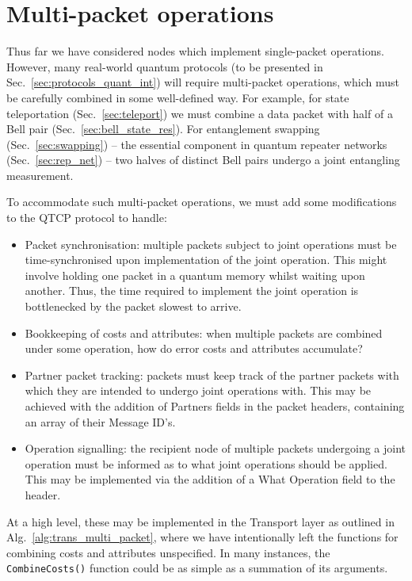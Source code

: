\documentclass[aps, rmp, twocolumn, amsmath, amssymb, nofootinbib, superscriptaddress, longbibliography, floatfix, table-of-contents, eqsecnum]{revtex4-1}
\newcommand{\comment}[1]{{\color{blue}{\textbf{#1}}}}
\begin{document}
\section{Multi-packet operations} 

\comment{To do}

Thus far we have considered nodes which implement single-packet operations. However, many real-world quantum protocols (to be presented in Sec.~\ref{sec:protocols_quant_int}) will require multi-packet operations, which must be carefully combined in some well-defined way. For example, for state teleportation (Sec.~\ref{sec:teleport}) we must combine a data packet with half of a Bell pair (Sec.~\ref{sec:bell_state_res}). For entanglement swapping (Sec.~\ref{sec:swapping}) -- the essential component in quantum repeater networks (Sec.~\ref{sec:rep_net}) -- two halves of distinct Bell pairs undergo a joint entangling measurement.

To accommodate such multi-packet operations, we must add some modifications to the QTCP protocol to handle:
\begin{itemize}
	\item Packet synchronisation: multiple packets subject to joint operations must be time-synchronised upon implementation of the joint operation. This might involve holding one packet in a quantum memory whilst waiting upon another. Thus, the time required to implement the joint operation is bottlenecked by the packet slowest to arrive.
	\item Bookkeeping of costs and attributes: when multiple packets are combined under some operation, how do error costs and attributes accumulate?
	\item Partner packet tracking: packets must keep track of the partner packets with which they are intended to undergo joint operations with. This may be achieved with the addition of {\sc Partners} fields in the packet headers, containing an array of their {\sc Message ID}'s.
	\item Operation signalling: the recipient node of multiple packets undergoing a joint operation must be informed as to what joint operations should be applied. This may be implemented via the addition of a {\sc What Operation} field to the header.
\end{itemize}

At a high level, these may be implemented in the {\sc Transport} layer as outlined in Alg.~\ref{alg:trans_multi_packet}, where we have intentionally left the functions for combining costs and attributes unspecified. In many instances, the \texttt{CombineCosts()} function could be as simple as a summation of its arguments.
\end{document}
